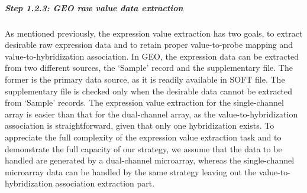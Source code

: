 







\subparagraph{Step 1.2.3: GEO raw value data extraction}


As mentioned previously, the expression value extraction has two goals, to
extract desirable raw expression data and to retain proper value-to-probe
mapping and value-to-hybridization association.
%
In GEO, the expression data can be extracted from two different sources, the
`Sample' record and the supplementary file.
%
The former is the primary data source, as it is readily available in SOFT
file.  The supplementary file is checked only when the desirable data cannot
be extracted from `Sample' records.
%
The expression value extraction for the single-channel array is easier than
that for the dual-channel array, as the value-to-hybridization association is
straightforward, given that only one hybridization exists.
%
To appreciate the full complexity of the expression value extraction task
and to demonstrate the full capacity of our strategy, we assume that the data
to be handled are generated by a dual-channel microarray,
%
whereas the single-channel microarray data can be handled by the same
strategy leaving out the value-to-hybridization association extraction part.





